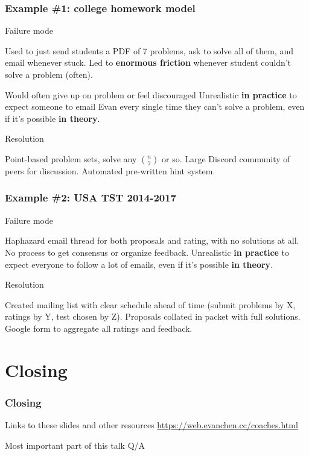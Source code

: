 \documentclass[10pt]{beamer}
\begin{document}
\begin{frame}
  \frametitle{Example \#1: college homework model}
  \begin{alertblock}{Failure mode}
    \begin{itemize}
      \ii Used to just send students a PDF of 7 problems,
      ask to solve all of them, and email whenever stuck.
      \ii Led to \textbf{enormous friction}
      whenever student couldn't solve a problem (often).
      \begin{itemize}
        \ii Would often give up on problem or feel discouraged
        \ii Unrealistic \textbf{in practice}
        to expect someone to email Evan every single time
        they can't solve a problem,
        even if it's possible \textbf{in theory}.
      \end{itemize}
    \end{itemize}
  \end{alertblock}
  \pause
  \begin{exampleblock}{Resolution}
    \begin{itemize}
      \ii Point-based problem sets,
      solve any $\binom n7$ or so.
      \ii Large Discord community of peers for discussion.
      \ii Automated pre-written hint system.
    \end{itemize}
  \end{exampleblock}
\end{frame}

\begin{frame}
  \frametitle{Example \#2: USA TST 2014-2017}
  \begin{alertblock}{Failure mode}
    \begin{itemize}
      \ii Haphazard email thread for both proposals and rating,
      with no solutions at all.
      \ii No process to get consensus or organize feedback.
      \ii Unrealistic \textbf{in practice} to expect
      everyone to follow a lot of emails,
      even if it's possible \textbf{in theory}.
    \end{itemize}
  \end{alertblock}
  \pause
  \begin{exampleblock}{Resolution}
    \begin{itemize}
      \ii Created mailing list with clear schedule ahead of time
      (submit problems by X, ratings by Y, test chosen by Z).
      \ii Proposals collated in packet with full solutions.
      \ii Google form to aggregate all ratings and feedback.
    \end{itemize}
  \end{exampleblock}
\end{frame}

\section{Closing}
\begin{frame}
  \frametitle{Closing}
  \begin{block}{Links to these slides and other resources}
    \url{https://web.evanchen.cc/coaches.html}
  \end{block}
  \bigskip
  \pause
  \begin{block}{Most important part of this talk}
    \LARGE\centering Q/A
  \end{block}
\end{frame}
\end{document}
